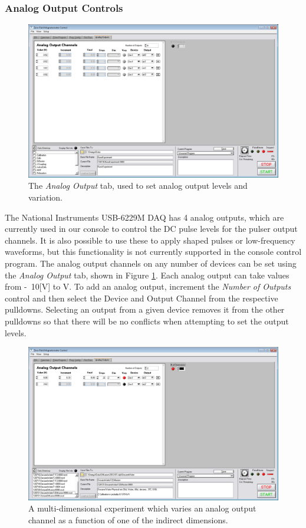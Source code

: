 \documentclass[PaulGanssle-Thesis.tex]{subfiles}
\begin{document}
\subsubsection{Analog Output Controls}
\label{console.software.analog.output}
\begin{figure}[!h]
\includegraphics[width=\tw]{figures/console/AnalogOutput1d.png}
\caption{The \textit{Analog Output} tab, used to set analog output levels and variation.}
\label{fig:AnalogOutputTab1D}
\end{figure}
The National Instruments USB-6229M DAQ has 4 analog outputs, which are currently used in our console to control the DC pulse levels for the pulser output channels. It is also possible to use these to apply shaped pulses or low-frequency waveforms, but this functionality is not currently supported in the console control program. The analog output channels on any number of devices can be set using the \textit{Analog Output} tab, shown in Figure \ref{fig:AnalogOutputTab1D}. Each analog output can take values from \unit{-10}[V] to \unit[10]{V}. To add an analog output, increment the \textit{Number of Outputs} control and then select the Device and Output Channel from the respective pulldowns. Selecting an output from a given device removes it from the other pulldowns so that there will be no conflicts when attempting to set the output levels.

\begin{figure}
\includegraphics[width=\tw]{figures/console/AnalogOutput2d.png}
\caption{A multi-dimensional experiment which varies an analog output channel as a function of one of the indirect dimensions.}
\label{fig:AnalogOutputTab2D}
\end{figure}
\end{document}
